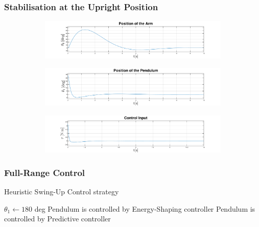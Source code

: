 \documentclass[]{beamer}
\begin{document}
\begin{frame}
	\frametitle{Stabilisation at the Upright Position}
	\begin{figure}[H]
		\centering
		\begin{subfigure}
			\centering
			\includegraphics[scale=0.25]{images/MPC/arm.pdf}  
		\end{subfigure}
		\begin{subfigure}
			\centering
			\includegraphics[scale=0.25]{images/MPC/pend.pdf}  
		\end{subfigure}
		\begin{subfigure}
			\centering
			\includegraphics[scale=0.25]{images/MPC/control.pdf} 
		\end{subfigure}
	\end{figure}
\end{frame}

\begin{frame}
	\frametitle{Full-Range Control}	
	\begin{algorithm}[H]
		\caption{Heuristic Swing-Up Control strategy}
		\begin{algorithmic}[1]
			\State $\theta_1 \gets 180$ deg
			\State Pendulum is controlled by Energy-Shaping controller
			\State Pendulum is controlled by Predictive controller
			\EndIf
			\EndProcedure	
		\end{algorithmic}
	\end{algorithm}	
\end{frame}
\end{document}
